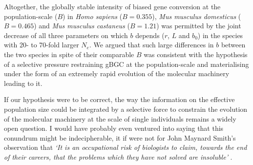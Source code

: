 Altogether, the globally stable intensity of biased gene conversion at the population-scale ($B$) in \textit{Homo sapiens} ($B = 0.355$), \textit{Mus musculus domesticus} ($B = 0.465$) and \textit{Mus musculus castaneus} ($B = 1.21$) was permitted by the joint decrease of all three parameters on which $b$ depends ($r$, $L$ and $b_0$) in the species with 20- to 70-fold larger $N_e$.
We argued that such large differences in $b$ between the two species in spite of their comparable $B$ was consistent with the hypothesis of a selective pressure restraining gBGC at the population-scale and materialising under the form of an extremely rapid evolution of the molecular machinery leading to it.

If our hypothesis were to be correct, the way the information on the effective population size could be integrated by a selective force to constrain the evolution of the molecular machinery at the scale of single individuals remains a widely open question.
I would have probably even ventured into saying that this conundrum might be indecipherable, it if were not for John Maynard Smith's observation that \textit{‘It is an occupational risk of biologists to claim, towards the end of their careers, that the problems which they have not solved are insoluble’} \citep{smith1988games}.



